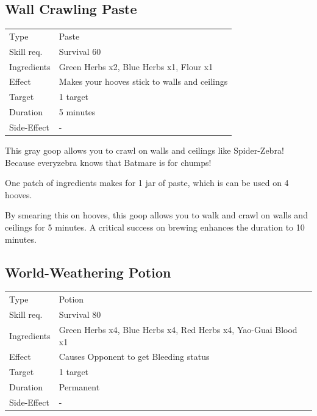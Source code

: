 \documentclass[11pt,a4paper,twocolumn]{book}
\begin{document}
\subsection*{Wall Crawling Paste}
{
	\begin{tabu} to 75mm{| X[l,4] | X[l,8] |}
		\hline
		Type 			& Paste 													\\
        Skill req.	    & Survival 60 												\\
        Ingredients     & Green Herbs x2, Blue Herbs x1, Flour x1					\\
        Effect     		& Makes your hooves stick to walls and ceilings 			\\
        Target      	& 1 target													\\
        Duration  		& 5 minutes	 												\\
        Side-Effect     & -															\\ \hline
	\end{tabu}
		
}

\medskip

This gray goop allows you to crawl on walls and ceilings like Spider-Zebra! Because everyzebra knows that Batmare is for chumps!

One patch of ingredients makes for 1 jar of paste, which is can be used on 4 hooves.

By smearing this on hooves, this goop allows you to walk and crawl on walls and ceilings for 5 minutes. A critical success on brewing enhances the duration to 10 minutes.


\subsection*{World-Weathering Potion}
{
	\begin{tabu} to 75mm{| X[l,4] | X[l,8] |}
		\hline
		Type 			& Potion 															\\
        Skill req.	    & Survival 80 														\\
        Ingredients     & Green Herbs x4, Blue Herbs x4, Red Herbs x4, Yao-Guai Blood x1	\\
        Effect     		& Causes Opponent to get Bleeding status 							\\
        Target      	& 1 target															\\
        Duration  		& Permanent	 														\\
        Side-Effect     & -																	\\ \hline
	\end{tabu}
		
}
\end{document}
